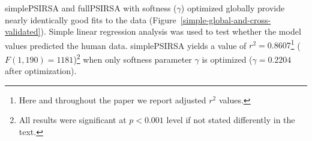 \documentclass[10pt,a4paper]{article}
\begin{document}
simplePSIRSA and fullPSIRSA with softness ($\gamma$) optimized globally provide nearly identically good fits to the data  (Figure~\ref{simple-global-and-cross-validated}). Simple linear regression analysis was used to test whether the model values predicted the human data. 
simplePSIRSA yields a value of $r^2 = 0.8607$\footnote{Here and throughout the paper we report adjusted $r^2$ values.} ($F(1,190) = 1181$)\footnote{All results were significant at $p < 0.001$ level if not stated differently in the text.} when only softness parameter $\gamma$ is optimized ($\gamma=0.2204$ after optimization). 
\end{document}
